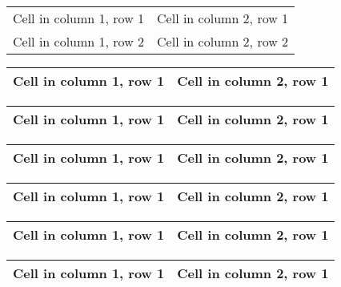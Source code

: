 \begin{center}
\begin{tabular}{|c|c|}
\hline
Cell in column 1, row 1 & Cell in column 2, row 1 \\
Cell in column 1, row 2 & Cell in column 2, row 2 \\
\hline
\end{tabular}
\end{center}

\begin{center}
\begin{tabular}{|c|c|}
\hline
Cell in column 1, row 1 & Cell in column 2, row 1 \\
\hline
\end{tabular}
\end{center}

\begin{center}
\begin{tabular}{|c|c|}
\hline
Cell in column 1, row 1 & Cell in column 2, row 1 \\
\hline
\end{tabular}
\end{center}

\begin{center}
\begin{tabular}{|c|c|}
\hline
Cell in column 1, row 1 & Cell in column 2, row 1 \\
\hline
\end{tabular}
\end{center}

\begin{center}
\begin{tabular}{|c|c|}
\hline
Cell in column 1, row 1 & Cell in column 2, row 1 \\
\hline
\end{tabular}
\end{center}

\begin{center}
\begin{tabular}{|c|c|}
\hline
Cell in column 1, row 1 & Cell in column 2, row 1 \\
\hline
\end{tabular}
\end{center}

\begin{center}
\begin{tabular}{|c|c|}
\hline
Cell in column 1, row 1 & Cell in column 2, row 1 \\
\hline
\end{tabular}
\end{center}

